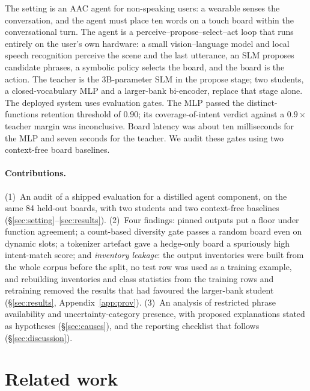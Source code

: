 The setting is an AAC agent for non-speaking users: a wearable senses the
conversation, and the agent must place ten words on a touch board within
the conversational turn. The agent is a perceive--propose--select--act loop
that runs entirely on the user's own hardware: a small vision--language
model and local speech recognition perceive the scene and the last
utterance, an SLM proposes candidate phrases, a symbolic policy selects
the board, and the board is the action. The teacher is the 3B-parameter
SLM in the propose stage; two students, a closed-vocabulary MLP and a
larger-bank bi-encoder, replace that stage alone.
The deployed system uses evaluation gates. The MLP passed the
distinct-functions retention threshold of 0.90; its coverage-of-intent
verdict against a $0.9\times$ teacher margin was inconclusive. Board
latency was about ten milliseconds for the MLP and seven seconds for the
teacher. We audit these gates using two context-free board baselines.

\paragraph{Contributions.}
(1)~An audit of a shipped evaluation for a distilled agent component, on
the same 84 held-out boards, with two students and two context-free
baselines (\S\ref{sec:setting}--\ref{sec:results}).
(2)~Four findings: pinned outputs put a floor under function agreement;
a count-based diversity gate passes a random board even on dynamic slots;
a tokenizer artefact gave a hedge-only board a spuriously high
intent-match score; and \emph{inventory leakage}: the output inventories
were built from the whole corpus before the split, no test row was used
as a training example, and rebuilding inventories and class statistics
from the training rows and retraining removed the results that had
favoured the larger-bank student (\S\ref{sec:results},
Appendix~\ref{app:prov}).
(3)~An analysis of restricted phrase availability and uncertainty-category
presence, with proposed explanations stated as hypotheses
(\S\ref{sec:causes}), and the reporting checklist that follows
(\S\ref{sec:discussion}).

\section{Related work}
\label{sec:related}

